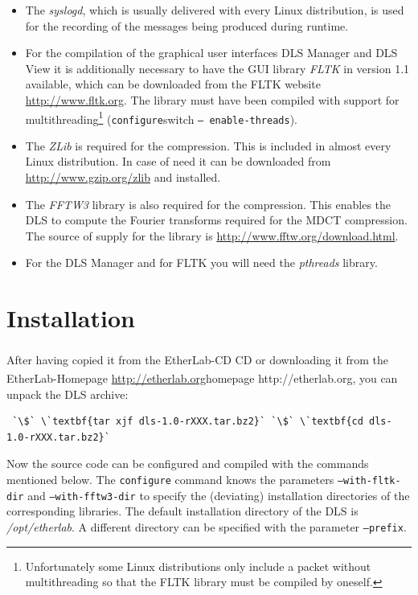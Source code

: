 \documentclass[a4paper,12pt,BCOR6mm,bibtotoc,idxtotoc]{scrbook}
\begin{document}
\begin{itemize} 
\item The \textit{syslogd}, which is usually delivered with every Linux distribution, is used for the recording of the messages being produced during runtime. 
\item For the compilation of the graphical user interfaces DLS Manager and DLS View it is additionally necessary to have the GUI library \textit{FLTK} in version 1.1 available, which can be downloaded from the FLTK website \url{http://www.fltk.org}. The library must have been compiled with support for multithreading\footnote{Unfortunately some Linux distributions only include a packet without multithreading so that the FLTK library must be compiled by oneself.} (\texttt{configure}switch \texttt{-- enable-threads}). 
\item The \textit{ZLib} is required for the compression. This is included in almost every Linux distribution. In case of need it can be downloaded from \url{http://www.gzip.org/zlib} and installed. 
\item The \textit{FFTW3} library is also required for the compression. This enables the DLS to compute the Fourier transforms required for the MDCT compression. The source of supply for the library is \url{http://www.fftw.org/download.html}. 
\item For the DLS Manager and for FLTK you will need the \textit{pthreads} library. \end{itemize}

\section{Installation}

After having copied it from the EtherLab\textsuperscript{\textregistered}-CD CD or downloading it from the EtherLab\textsuperscript{\textregistered}-Homepage \url{http://etherlab.org}homepage http://etherlab.org, you can unpack the DLS archive:

\begin{lstlisting} `\$` \`textbf{tar xjf dls-1.0-rXXX.tar.bz2}` `\$` \`textbf{cd dls-1.0-rXXX.tar.bz2}` \end{lstlisting}

Now the source code can be configured and compiled with the commands mentioned below. The \texttt{configure} command knows the parameters \texttt{--with-fltk-dir} and \texttt{--with-fftw3-dir} to specify the (deviating) installation directories of the corresponding libraries. The default installation directory of the DLS is \textit{/opt/etherlab}. A different directory can be specified with the parameter \texttt{--prefix}.
\end{document}

